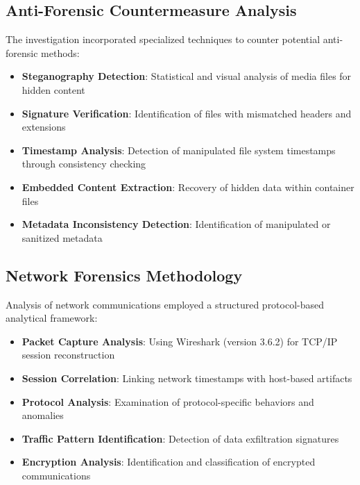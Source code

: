 \subsection{Anti-Forensic Countermeasure Analysis}
The investigation incorporated specialized techniques to counter potential anti-forensic methods:

\begin{itemize}
    \item \textbf{Steganography Detection}: Statistical and visual analysis of media files for hidden content
    
    \item \textbf{Signature Verification}: Identification of files with mismatched headers and extensions
    
    \item \textbf{Timestamp Analysis}: Detection of manipulated file system timestamps through consistency checking
    
    \item \textbf{Embedded Content Extraction}: Recovery of hidden data within container files
    
    \item \textbf{Metadata Inconsistency Detection}: Identification of manipulated or sanitized metadata
\end{itemize}

\subsection{Network Forensics Methodology}
Analysis of network communications employed a structured protocol-based analytical framework:

\begin{itemize}
    \item \textbf{Packet Capture Analysis}: Using Wireshark (version 3.6.2) for TCP/IP session reconstruction
    
    \item \textbf{Session Correlation}: Linking network timestamps with host-based artifacts
    
    \item \textbf{Protocol Analysis}: Examination of protocol-specific behaviors and anomalies
    
    \item \textbf{Traffic Pattern Identification}: Detection of data exfiltration signatures
    
    \item \textbf{Encryption Analysis}: Identification and classification of encrypted communications
\end{itemize}

